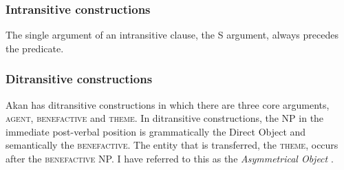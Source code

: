 \documentclass[output=paper]{langsci/langscibook}
\begin{document}
\subsubsection{Intransitive constructions}\label{§2.3.2:intransitive.osam}

The single argument of an intransitive clause, the S argument, always precedes the predicate. 

\ea
\label{ex:17.osam}
	\z

	\z
\z

\subsubsection{Ditransitive constructions}\label{§2.3.3:ditransitive.osam}

Akan has ditransitive constructions in which there are three core arguments, \textsc{agent, benefactive} and \textsc{theme}. In ditransitive constructions, the NP in the immediate post-verbal position is grammatically the Direct Object and semantically the \textsc{benefactive}. The entity that is transferred, the \textsc{theme}, occurs after the \textsc{benefactive} NP. I have referred to this as the \textit{Asymmetrical Object} \citep{osam2000}.

\ea
\label{ex:18.osam}
	\z

	\z
\z
\end{document}

